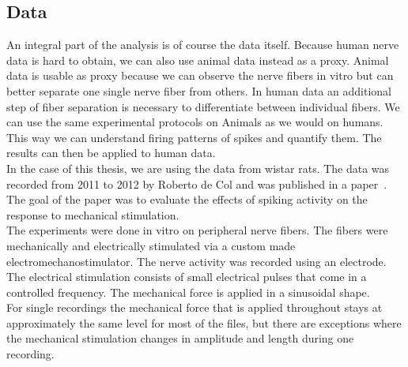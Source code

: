 \subsection{Data}
An integral part of the analysis is of course the data itself. Because human nerve data is hard to obtain, we can also use animal data instead as a proxy. Animal data is usable as proxy because we can observe the nerve fibers in vitro but can better separate one single nerve fiber from others. In human data an additional step of fiber separation is necessary to differentiate between individual fibers. We can use the same experimental protocols on Animals as we would on humans. This way we can understand firing patterns of spikes and quantify them. The results can then be applied to human data. \\
In the case of this thesis, we are using the data from wistar rats. The data was recorded from 2011 to 2012 by Roberto de Col and was published in a paper~\cite{roberto}. The goal of the paper was to evaluate the effects of spiking activity on the response to mechanical stimulation. \\
The experiments were done in vitro on peripheral nerve fibers. The fibers were mechanically and electrically stimulated via a custom made electromechanostimulator. The nerve activity was recorded using an electrode. The electrical stimulation consists of small electrical pulses that come in a controlled frequency. The mechanical force is applied in a sinusoidal shape. \\
For single recordings the mechanical force that is applied throughout stays at approximately the same level for most of the files, but there are exceptions where the mechanical stimulation changes in amplitude and length during one recording. 

